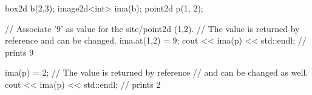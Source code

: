 box2d b(2,3);
image2d<int> ima(b);
point2d p(1, 2);

// Associate '9' as value for the site/point2d (1,2).
// The value is returned by reference and can be changed.
ima.at(1,2) = 9;
cout << ima(p) << std::endl; // prints 9

ima(p) = 2; // The value is returned by reference
// and can be changed as well.
cout << ima(p) << std::endl; // prints 2
